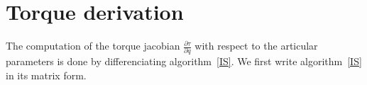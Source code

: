 

\section{Torque derivation}
\label{sec:torque_derivation}


The computation of the torque jacobian $\frac{\partial \tau}{\partial q}$ with respect to the articular parameters is done by differenciating algorithm~\ref{IS}.
We first write algorithm~\ref{IS} in its matrix form.

